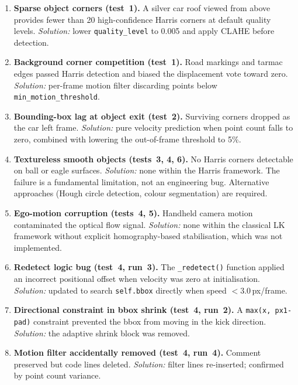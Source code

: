 \documentclass[12pt,a4paper]{article}
\begin{document}
\begin{enumerate}[leftmargin=1.8em]
  \item \textbf{Sparse object corners (test~1).} A silver car roof viewed from above provides
    fewer than 20 high-confidence Harris corners at default quality levels. \textit{Solution:}
    lower \texttt{quality\_level} to 0.005 and apply CLAHE before detection.

  \item \textbf{Background corner competition (test~1).} Road markings and tarmac edges passed
    Harris detection and biased the displacement vote toward zero. \textit{Solution:}
    per-frame motion filter discarding points below \texttt{min\_motion\_threshold}.

  \item \textbf{Bounding-box lag at object exit (test~2).} Surviving corners dropped as the car
    left frame. \textit{Solution:} pure velocity prediction when point count falls to zero,
    combined with lowering the out-of-frame threshold to 5\%.

  \item \textbf{Textureless smooth objects (tests~3, 4, 6).} No Harris corners detectable on
    ball or eagle surfaces. \textit{Solution:} none within the Harris framework. The failure
    is a fundamental limitation, not an engineering bug. Alternative approaches (Hough
    circle detection, colour segmentation) are required.

  \item \textbf{Ego-motion corruption (tests~4, 5).} Handheld camera motion contaminated the
    optical flow signal. \textit{Solution:} none within the classical LK framework without
    explicit homography-based stabilisation, which was not implemented.

  \item \textbf{Redetect logic bug (test~4, run~3).} The \texttt{\_redetect()} function applied
    an incorrect positional offset when velocity was zero at initialisation. \textit{Solution:}
    updated to search \texttt{self.bbox} directly when speed $< 3.0$\,px/frame.

  \item \textbf{Directional constraint in bbox shrink (test~4, run~2).} A \texttt{max(x, px1-pad)}
    constraint prevented the bbox from moving in the kick direction. \textit{Solution:}
    the adaptive shrink block was removed.

  \item \textbf{Motion filter accidentally removed (test~4, run~4).} Comment preserved but code
    lines deleted. \textit{Solution:} filter lines re-inserted; confirmed by point count variance.


\end{enumerate}
\end{document}
